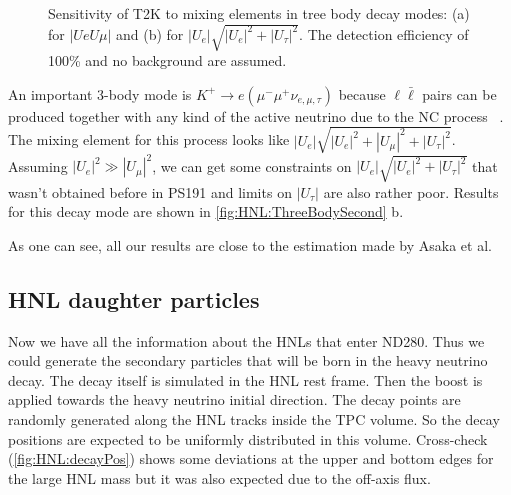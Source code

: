 \documentclass[../main.tex]{subfiles}
\begin{document}
\begin{figure}[!ht]
    \begin{minipage}[!ht]{0.49\linewidth}
    \end{minipage}
    \hfill
    \begin{minipage}[!ht]{0.49\linewidth}
    \end{minipage}
    \caption{Sensitivity of T2K to mixing elements in tree body decay modes: (a) for $\left|UeU\mu\right|$ and (b) for $\left|U_{e}\right|\sqrt{\left|U_{e}\right|^2+\left|U_{\tau}\right|^2}$. The detection efficiency of 100\% and no background are assumed.}
    \label{fig:HNL:ThreeBodySecond}
\end{figure}

An important 3-body mode is $K^+\rightarrow e(\mu^-\mu^+\nu_{e,\mu,\tau})$ because $\ell\bar{\ell}$ pairs can be produced together with any kind of the active neutrino due to  the NC process ~\cite{Johnson1997}. The mixing element for this process looks like $\left|U_{e}\right|\sqrt{\left|U_{e}\right|^2+\left|U_{\mu}\right|^2+\left|U_{\tau}\right|^2}$. Assuming $\left|U_e\right|^2 \gg\left|U_{\mu}\right|^2$, we can get some constraints on $\left|U_{e}\right|\sqrt{\left|U_{e}\right|^2+\left|U_{\tau}\right|^2}$ that wasn't obtained before in PS191 and limits on $\left|U_{\tau}\right|$ are also rather poor. Results for this decay mode are shown in \autoref{fig:HNL:ThreeBodySecond} b.

As one can see, all our results are close to the estimation made by Asaka et al.

\subsection{HNL daughter particles}
Now we have all the information about the HNLs that enter ND280. Thus we could generate the secondary particles that will be born in the heavy neutrino decay. The decay itself is simulated in the HNL rest frame. Then the boost is applied towards the heavy neutrino initial direction. The decay points are randomly generated along the  HNL tracks inside the TPC volume. So the decay positions are expected to be uniformly distributed in this volume. Cross-check (\autoref{fig:HNL:decayPos}) shows some deviations at the upper and bottom edges for the large HNL mass but it was also expected due to the off-axis flux.
\end{document}
